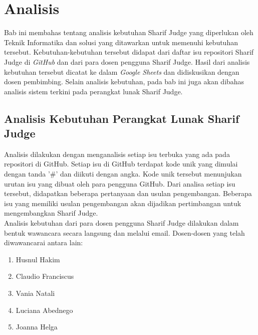 \chapter{Analisis}
\label{chap:analisis}

Bab ini membahas tentang analisis kebutuhan Sharif Judge yang diperlukan oleh Teknik Informatika dan solusi yang ditawarkan untuk memenuhi kebutuhan tersebut. Kebutuhan-kebutuhan tersebut didapat dari daftar isu repositori Sharif Judge di \textit{GitHub} dan dari para dosen pengguna Sharif Judge. Hasil dari analisis kebutuhan tersebut dicatat ke dalam \textit{Google Sheets} dan didiskusikan dengan dosen pembimbing. Selain analisis kebutuhan, pada bab ini juga akan dibahas analisis sistem terkini pada perangkat lunak Sharif Judge.


\section{Analisis Kebutuhan Perangkat Lunak Sharif Judge}
\label{sec:analisis}
Analisis dilakukan dengan menganalisis setiap isu terbuka yang ada pada repositori di GitHub. Setiap isu di GitHub terdapat kode unik yang dimulai dengan tanda '\#' dan diikuti dengan angka. Kode unik tersebut menunjukan urutan isu yang dibuat oleh para pengguna GitHub. Dari analisa setiap isu tersebut, didapatkan beberapa pertanyaan dan usulan pengembangan. Beberapa isu yang memiliki usulan pengembangan akan dijadikan pertimbangan untuk mengembangkan Sharif Judge. \\

Analisis kebutuhan dari para dosen pengguna Sharif Judge dilakukan dalam bentuk wawancara secara langsung dan melalui email. Dosen-dosen yang telah diwawancarai antara lain:
\begin{enumerate}
	\item Husnul Hakim
	\item Claudio Franciscus
	\item Vania Natali
	\item Luciana Abednego
	\item Joanna Helga
\end{enumerate}

